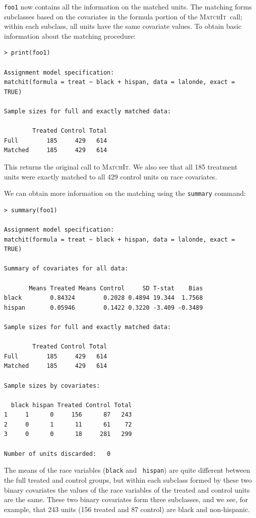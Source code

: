\documentclass[oneside,letterpaper,titlepage]{article}
\newcommand{\MatchIt}{\textsc{MatchIt}}
\begin{document}
\noindent \texttt{foo1} now contains all the information on the matched units.  The matching forms subclasses based on the covariates
in the formula portion of the \MatchIt\ call; within each subclass, all units have the same covariate values.  
To obtain basic information about the matching procedure: 

\begin{verbatim}
> print(foo1)
 
Assignment model specification:
matchit(formula = treat ~ black + hispan, data = lalonde, exact = TRUE)
 
Sample sizes for full and exactly matched data:
 
        Treated Control Total
Full        185     429   614
Matched     185     429   614
\end{verbatim} 
 
This returns the original call to \MatchIt.  We also see that all 185
treatment units were exactly matched to all 429 control units on race
covariates.  

We can obtain more information on the matching using the {\tt summary} command:

\begin{verbatim}
> summary(foo1)
 
Assignment model specification:
matchit(formula = treat ~ black + hispan, data = lalonde, exact = TRUE)
 
Summary of covariates for all data:
 
       Means Treated Means Control     SD T-stat    Bias
black        0.84324        0.2028 0.4894 19.344  1.7568
hispan       0.05946        0.1422 0.3220 -3.409 -0.3489
  
Sample sizes for full and exactly matched data:
 
        Treated Control Total
Full        185     429   614
Matched     185     429   614
 
Sample sizes by covariates:
 
  black hispan Treated Control Total
1     1      0     156      87   243
2     0      1      11      61    72
3     0      0      18     281   299
 
Number of units discarded:   0
\end{verbatim}

The means of the race variables ({\tt black} and {\tt
  hispan}) are quite different between the full treated and control groups, but within
each subclass formed by these two binary covariates the values of the
race variables of the treated and control units
are the same.  These two binary covariates form three subclasses, and
we see, for example, that 243 units (156 treated and 87 control) are
black and non-hispanic.
\end{document}
